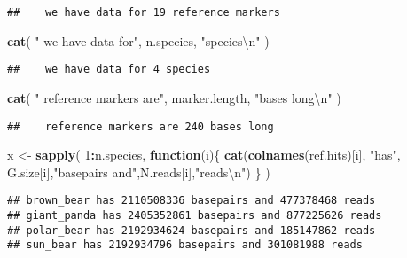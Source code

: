 \documentclass[]{article}
\newenvironment{Shaded}{\begin{snugshade}}{\end{snugshade}}
\newcommand{\KeywordTok}[1]{\textcolor[rgb]{0.13,0.29,0.53}{\textbf{#1}}}
\newcommand{\DecValTok}[1]{\textcolor[rgb]{0.00,0.00,0.81}{#1}}
\newcommand{\CharTok}[1]{\textcolor[rgb]{0.31,0.60,0.02}{#1}}
\newcommand{\StringTok}[1]{\textcolor[rgb]{0.31,0.60,0.02}{#1}}
\newcommand{\ControlFlowTok}[1]{\textcolor[rgb]{0.13,0.29,0.53}{\textbf{#1}}}
\newcommand{\OperatorTok}[1]{\textcolor[rgb]{0.81,0.36,0.00}{\textbf{#1}}}
\newcommand{\NormalTok}[1]{#1}
\begin{document}
\begin{verbatim}
##    we have data for 19 reference markers
\end{verbatim}

\begin{Shaded}
\begin{Highlighting}[]
\KeywordTok{cat}\NormalTok{( }\StringTok{"   we have data for"}\NormalTok{, n.species, }\StringTok{"species}\CharTok{\textbackslash{}n}\StringTok{"}\NormalTok{ )}
\end{Highlighting}
\end{Shaded}

\begin{verbatim}
##    we have data for 4 species
\end{verbatim}

\begin{Shaded}
\begin{Highlighting}[]
\KeywordTok{cat}\NormalTok{( }\StringTok{"   reference markers are"}\NormalTok{, marker.length, }\StringTok{"bases long}\CharTok{\textbackslash{}n}\StringTok{"}\NormalTok{ )}
\end{Highlighting}
\end{Shaded}

\begin{verbatim}
##    reference markers are 240 bases long
\end{verbatim}

\begin{Shaded}
\begin{Highlighting}[]
\NormalTok{x <-}\StringTok{ }\KeywordTok{sapply}\NormalTok{( }\DecValTok{1}\OperatorTok{:}\NormalTok{n.species, }\ControlFlowTok{function}\NormalTok{(i)\{}
  \KeywordTok{cat}\NormalTok{(}\KeywordTok{colnames}\NormalTok{(ref.hits)[i], }\StringTok{"has"}\NormalTok{, G.size[i],}\StringTok{"basepairs and"}\NormalTok{,N.reads[i],}\StringTok{"reads}\CharTok{\textbackslash{}n}\StringTok{"}\NormalTok{)}
\NormalTok{\} )}
\end{Highlighting}
\end{Shaded}

\begin{verbatim}
## brown_bear has 2110508336 basepairs and 477378468 reads
## giant_panda has 2405352861 basepairs and 877225626 reads
## polar_bear has 2192934624 basepairs and 185147862 reads
## sun_bear has 2192934796 basepairs and 301081988 reads
\end{verbatim}
\end{document}
